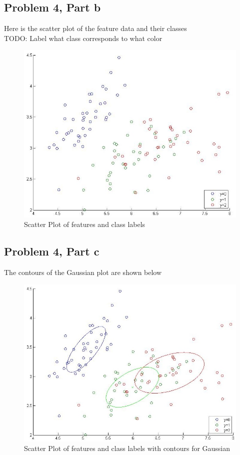 \documentclass[11pt,psfig]{article}
\begin{document}
\newpage

\subsection*{Problem 4, Part b}

Here is the scatter plot of the feature data and their classes\\
TODO: Label what class corresponds to what color

\begin{figure}[H]
\centering
\includegraphics[width=\columnwidth]{prob4bScatter.jpg}
\caption{Scatter Plot of features and class labels}
\end{figure}

\newpage

\subsection*{Problem 4, Part c}

The contours of the Gaussian plot are shown below\\

\begin{figure}[H]
\centering
\includegraphics[width=\columnwidth]{prob4cScatter.jpg}
\caption{Scatter Plot of features and class labels with contours for Gaussian}
\end{figure}
\end{document}
